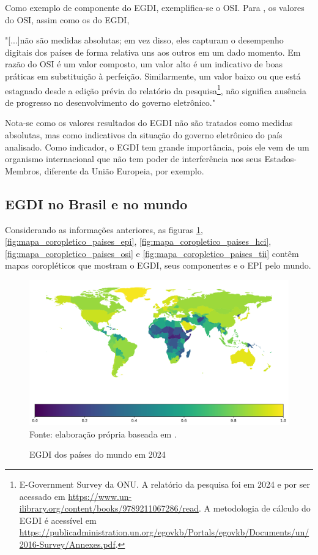 Como exemplo de componente do EGDI, exemplifica-se o OSI. Para \cite{onu_egov_survey_2024}, os valores do OSI, assim como os do EGDI, 

\noindent
\begin{flushleft}
	\setlength{\leftskip}{4cm}
	\small
	"[...]não são medidas absolutas; em vez disso, eles capturam o desempenho digitais dos países de forma relativa uns aos outros em um dado momento. Em razão do OSI é um valor composto, um valor alto é um indicativo de boas práticas em substituição à perfeição. Similarmente, um valor baixo ou que está estagnado desde a edição prévia do relatório da pesquisa\footnote{E-Government Survey da ONU. A relatório da pesquisa foi em 2024 e por ser acessado em \url{https://www.un-ilibrary.org/content/books/9789211067286/read}. A metodologia de cálculo do EGDI é acessível em \url{https://publicadministration.un.org/egovkb/Portals/egovkb/Documents/un/2016-Survey/Annexes.pdf}.}, não significa ausência de progresso no desenvolvimento do governo eletrônico." \cite{onu_egov_survey_2024}
\end{flushleft}

Nota-se como os valores resultados do EGDI não são tratados como medidas absolutas, mas como indicativos da situação do governo eletrônico do país analisado. Como indicador, o EGDI tem grande importância, pois ele vem de um organismo internacional que não tem poder de interferência nos seus Estados-Membros, diferente da União Europeia, por exemplo.

\subsection{EGDI no Brasil e no mundo}

Considerando as informações anteriores, as figuras \ref{fig:mapa_coropletico_paises_egdi}, \ref{fig:mapa_coropletico_paises_epi}, \ref{fig:mapa_coropletico_paises_hci}, \ref{fig:mapa_coropletico_paises_osi} e \ref{fig:mapa_coropletico_paises_tii} contêm mapas coropléticos que mostram o EGDI, seus componentes e o EPI pelo mundo.

\begin{figure}[H]
	\centering
	\caption{EGDI dos países do mundo em 2024}
	\includegraphics[width=1\linewidth]{figuras/mapa_coropletico_paises_egdi}
	\label{fig:mapa_coropletico_paises_egdi}
	\footnotesize{Fonte: elaboração própria baseada em \cite{ONU_EGDI_dados}.}
\end{figure}

